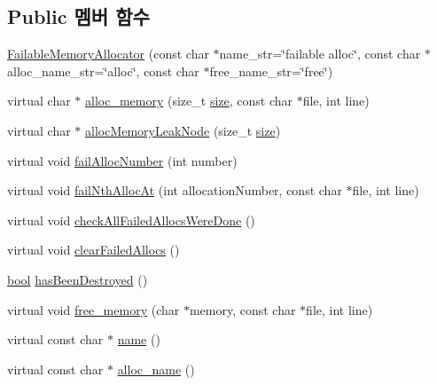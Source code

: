 \subsection*{Public 멤버 함수}
\begin{DoxyCompactItemize}
\item 
\hyperlink{class_failable_memory_allocator_a8b8a34754e34e008e3a8a6383f566cd6}{Failable\+Memory\+Allocator} (const char $\ast$name\+\_\+str=\char`\"{}failable alloc\char`\"{}, const char $\ast$alloc\+\_\+name\+\_\+str=\char`\"{}alloc\char`\"{}, const char $\ast$free\+\_\+name\+\_\+str=\char`\"{}free\char`\"{})
\item 
virtual char $\ast$ \hyperlink{class_failable_memory_allocator_a2ebbde51a1d514c74e9e2a09a21b0624}{alloc\+\_\+memory} (size\+\_\+t \hyperlink{gst__avb__playbin_8c_a439227feff9d7f55384e8780cfc2eb82}{size}, const char $\ast$file, int line)
\item 
virtual char $\ast$ \hyperlink{class_failable_memory_allocator_a1a786ad58b46528e82235a14fa667c1d}{alloc\+Memory\+Leak\+Node} (size\+\_\+t \hyperlink{gst__avb__playbin_8c_a439227feff9d7f55384e8780cfc2eb82}{size})
\item 
virtual void \hyperlink{class_failable_memory_allocator_a6a7693ae52e6128fcaa4f6b828fa34a7}{fail\+Alloc\+Number} (int number)
\item 
virtual void \hyperlink{class_failable_memory_allocator_a7ba3140d07c8db435e2cfb9b04e508c2}{fail\+Nth\+Alloc\+At} (int allocation\+Number, const char $\ast$file, int line)
\item 
virtual void \hyperlink{class_failable_memory_allocator_ad9383b8fff31273033f9de1e9d913c50}{check\+All\+Failed\+Allocs\+Were\+Done} ()
\item 
virtual void \hyperlink{class_failable_memory_allocator_aa09a5d5a71e98690dc53499607a36e1c}{clear\+Failed\+Allocs} ()
\item 
\hyperlink{avb__gptp_8h_af6a258d8f3ee5206d682d799316314b1}{bool} \hyperlink{class_test_memory_allocator_ae26c82159ce24eb59770352585b402fd}{has\+Been\+Destroyed} ()
\item 
virtual void \hyperlink{class_test_memory_allocator_a529ac9813d3b0836ce0b964449942534}{free\+\_\+memory} (char $\ast$memory, const char $\ast$file, int line)
\item 
virtual const char $\ast$ \hyperlink{class_test_memory_allocator_a6a96605bec5749750a0b4be6e2d6e721}{name} ()
\item 
virtual const char $\ast$ \hyperlink{class_test_memory_allocator_afab6c44b5468c71a699c1efbd787e6e7}{alloc\+\_\+name} ()

\end{DoxyCompactItemize}

